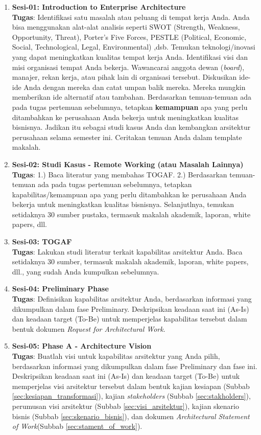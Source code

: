 \begin{enumerate}
	\item \textbf{Sesi-01: Introduction to Enterprise Architecture} \\
	\textbf{Tugas}: Identifikasi satu masalah atau peluang di tempat kerja Anda. Anda bisa menggunakan alat-alat analisis seperti SWOT (Strength, Weakness, Opportunity, Threat), Porter's Five Forces, PESTLE (Political, Economic, Social, Technological, Legal, Environmental) ,dsb. Temukan teknologi/inovasi yang dapat meningkatkan kualitas tempat kerja Anda. Identifikasi visi dan misi organisasi tempat Anda bekerja. Wawancarai anggota dewan (\textit{board}), manajer, rekan kerja, atau pihak lain di organisasi tersebut.  Diskusikan ide-ide Anda dengan mereka dan catat umpan balik mereka. Mereka mungkin memberikan ide alternatif atau tambahan. Berdasarkan temuan-temuan ada pada tugas pertemuan sebelumnya, tetapkan \textbf{kemampuan} apa yang perlu ditambahkan ke perusahaan Anda bekerja untuk meningkatkan kualitas bisnisnya. Jadikan itu sebagai studi kasus Anda dan kembangkan arsitektur perusahaan selama semester ini. Ceritakan temuan Anda dalam template makalah.
	
	
	\item \textbf{Sesi-02: Studi Kasus - Remote Working (atau Masalah Lainnya)} \\
	\textbf{Tugas}: 1.) Baca literatur yang membahas TOGAF. 2.) Berdasarkan temuan-temuan ada pada tugas pertemuan sebelumnya, tetapkan kapabilitas/kemampuan apa yang perlu ditambahkan ke perusahaan Anda bekerja untuk meningkatkan kualitas bisnisnya. Selanjutlnya, temukan setidaknya 30 sumber pustaka, termasuk makalah akademik, laporan, white papers, dll.
	
	
	\item \textbf{Sesi-03: TOGAF} \\
	\textbf{Tugas}: Lakukan studi literatur terkait kapabilitas arsitektur Anda. Baca setidaknya 30 sumber, termasuk makalah akademik, laporan, white papers, dll., yang sudah Anda kumpulkan sebelumnya.
	
	\item \textbf{Sesi-04: Preliminary Phase} \\
	\textbf{Tugas}: Definisikan kapabilitas arsitektur Anda, berdasarkan informasi yang dikumpulkan dalam fase Preliminary. Deskripsikan keadaan saat ini (As-Is) dan keadaan target (To-Be) untuk memperjelas kapabilitas tersebut dalam bentuk dokumen \textit{Request for Architectural Work}.
	
	\item \textbf{Sesi-05: Phase A - Architecture Vision} \\
	\textbf{Tugas}: Buatlah visi untuk kapabilitas arsitektur yang Anda pilih, berdasarkan informasi yang dikumpulkan dalam fase Preliminary dan fase ini. Deskripsikan keadaan saat ini (As-Is) dan keadaan target (To-Be) untuk memperjelas visi arsitektur tersebut dalam bentuk kajian kesiapan (Subbab \ref{sec:kesiapan_transformasi}), kajian \textit{stakeholders} (Subbab \ref{sec:stakholders}), perumusan visi arsitektur (Subbab \ref{sec:visi_arsitektur}), kajian skenario bisnis (Subbab \ref{sec:skenario_bisnis}), dan dokumen \textit{Architectural Statement of Work}(Subbab \ref{sec:stament_of_work}).
	

\end{enumerate}
